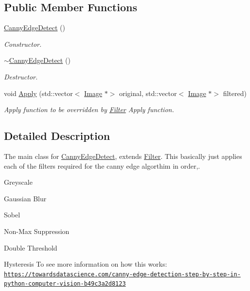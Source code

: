 \subsection*{Public Member Functions}
\begin{DoxyCompactItemize}
\item 
\mbox{\label{classCannyEdgeDetect_abe04677896a21d58d144783cc3aefb35}} 
\hyperlink{classCannyEdgeDetect_abe04677896a21d58d144783cc3aefb35}{Canny\+Edge\+Detect} ()
\begin{DoxyCompactList}\small\item\em Constructor. \end{DoxyCompactList}\item 
\mbox{\label{classCannyEdgeDetect_a4ccdf28f996d538eb8aee486acfbaea3}} 
\hyperlink{classCannyEdgeDetect_a4ccdf28f996d538eb8aee486acfbaea3}{$\sim$\+Canny\+Edge\+Detect} ()
\begin{DoxyCompactList}\small\item\em Destructor. \end{DoxyCompactList}\item 
\mbox{\label{classCannyEdgeDetect_a906422525db16b541c1765b431865e58}} 
void \hyperlink{classCannyEdgeDetect_a906422525db16b541c1765b431865e58}{Apply} (std\+::vector$<$ \hyperlink{classImage}{Image} $\ast$$>$ original, std\+::vector$<$ \hyperlink{classImage}{Image} $\ast$$>$ filtered)
\begin{DoxyCompactList}\small\item\em Apply function to be overridden by \hyperlink{classFilter}{Filter} Apply function. \end{DoxyCompactList}\end{DoxyCompactItemize}


\subsection{Detailed Description}
The main class for \hyperlink{classCannyEdgeDetect}{Canny\+Edge\+Detect}, extends \hyperlink{classFilter}{Filter}. This basically just applies each of the filters required for the canny edge algorthim in order,. 


\begin{DoxyEnumerate}
\item Greyscale
\item Gaussian Blur
\item Sobel
\item Non-\/\+Max Suppression
\item Double Threshold
\item Hysteresis To see more information on how this works\+: \href{https://towardsdatascience.com/canny-edge-detection-step-by-step-in-python-computer-vision-b49c3a2d8123}{\tt https\+://towardsdatascience.\+com/canny-\/edge-\/detection-\/step-\/by-\/step-\/in-\/python-\/computer-\/vision-\/b49c3a2d8123} 
\end{DoxyEnumerate}

